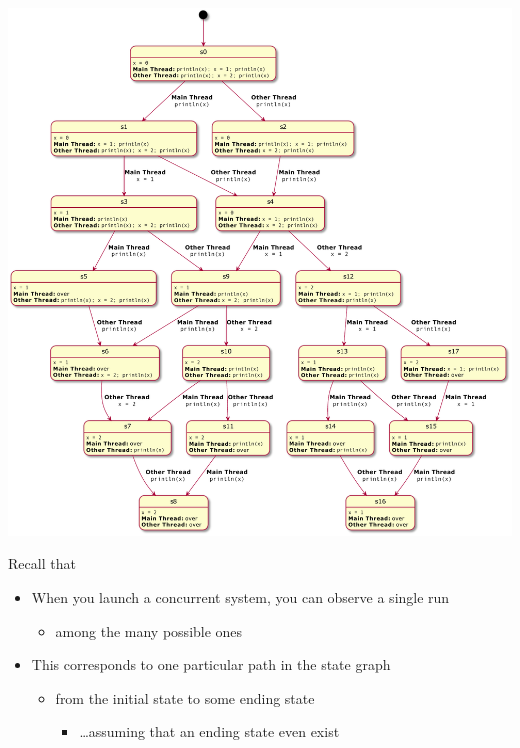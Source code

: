 \documentclass[presentation]{beamer}\mode<presentation>{\usetheme{AMSBolognaFC}}
\begin{document}
\begin{frame}[allowframebreaks]
\begin{center}
        \includegraphics[height=.7\textheight]{img/state-diagram.pdf}
    \end{center}

    \framebreak

    \begin{alertblock}{Recall that}
        \begin{itemize}
            \item When you launch a concurrent system, you can observe a single run
            \begin{itemize}
                \item among the many possible ones
            \end{itemize}

            \item This corresponds to one particular path in the state graph
            \begin{itemize}
                \item from the initial state to some ending state
                \begin{itemize}
                    \item \ldots assuming that an ending state even exist
                \end{itemize}
            \end{itemize}
        \end{itemize}
    \end{alertblock}

\end{frame}
\end{document}
